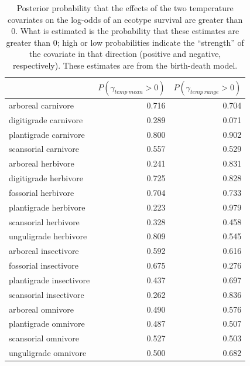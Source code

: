 \documentclass[12pt,letterpaper]{article}
\begin{document}
\begin{table}[ht]
  \centering
  \caption[Posterior probablity of effects of temperature on survival]{Posterior probability that the effects of the two temperature covariates on the log-odds of an ecotype survival are greater than 0. What is estimated is the probability that these estimates are greater than 0; high or low probabilities indicate the ``strength'' of the covariate in that direction (positive and negative, respectively). These estimates are from the birth-death model.}
  \label{tab:surv_temp}
  \begin{tabular}{ l r r }
    \hline
    & \(P(\gamma_{temp\ mean} > 0)\) & \(P(\gamma_{temp\ range} > 0)\) \\ 
    \hline
    arboreal carnivore & 0.716 & 0.704 \\ 
    digitigrade carnivore & 0.289 & 0.071 \\ 
    plantigrade carnivore & 0.800 & 0.902 \\ 
    scansorial carnivore & 0.557 & 0.529 \\ 
    arboreal herbivore & 0.241 & 0.831 \\ 
    digitigrade herbivore & 0.725 & 0.828 \\ 
    fossorial herbivore & 0.704 & 0.733 \\ 
    plantigrade herbivore & 0.223 & 0.979 \\ 
    scansorial herbivore & 0.328 & 0.458 \\ 
    unguligrade herbivore & 0.809 & 0.545 \\ 
    arboreal insectivore & 0.592 & 0.616 \\ 
    fossorial insectivore & 0.675 & 0.276 \\ 
    plantigrade insectivore & 0.437 & 0.697 \\ 
    scansorial insectivore & 0.262 & 0.836 \\ 
    arboreal omnivore & 0.490 & 0.576 \\ 
    plantigrade omnivore & 0.487 & 0.507 \\ 
    scansorial omnivore & 0.527 & 0.503 \\ 
    unguligrade omnivore & 0.500 & 0.682 \\ 
    \hline
  \end{tabular}
\end{table}
\end{document}
